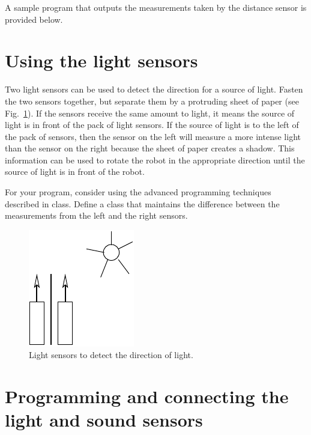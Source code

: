 \documentclass[12pt]{book}
\begin{document}
A sample program that outputs the measurements taken by the distance sensor is provided below.




\section{Using the light sensors}

Two light sensors can be used to detect the direction for a source of
light.  Fasten the two sensors together, but separate them by a
protruding sheet of paper (see Fig.~\ref*{fig:2eyes}).  If the sensors
receive the same amount to light, it means the source of light is in
front of the pack of light sensors. If the source of light is to the
left of the pack of sensors, then the sensor on the left will measure
a more intense light than the sensor on the right because the sheet
of paper creates a shadow. This information can be used to rotate the
robot in the appropriate direction until the source of light is in
front of the robot.

For your program, consider using the advanced programming techniques described in class. Define a class that maintains the difference between the measurements from
the left and the right sensors.

\begin{figure}[tb]
  \begin{center}
	\includegraphics[width=.2\textwidth]{figs/2eyes}
  \end{center}
\caption{Light sensors to detect the direction of
  light.}	\label{fig:2eyes} 
\end{figure}


\section{Programming and connecting the light and sound sensors}
\end{document}
